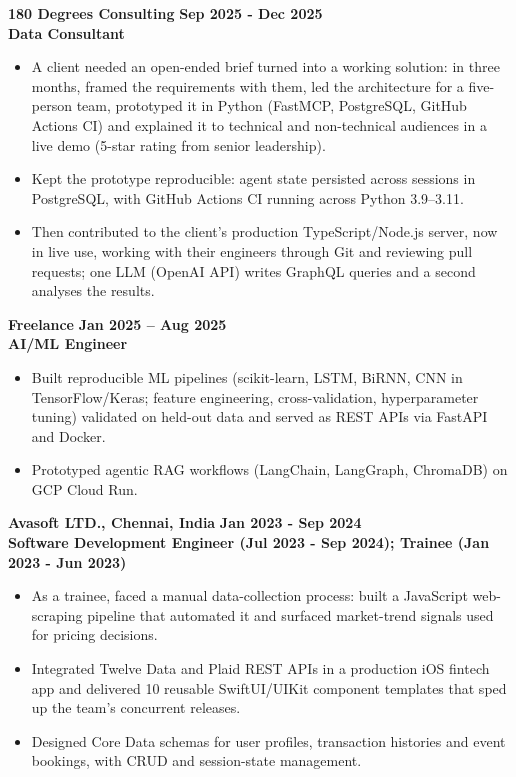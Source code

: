\documentclass[a4paper,11pt]{article}
\begin{document}
\vspace{6pt}

\noindent
\textbf{180 Degrees Consulting}
\hfill \textbf{Sep 2025 - Dec 2025}
\\
\textbf{Data Consultant}

\begin{itemize}
    \item A client needed an open-ended brief turned into a working solution: in three months, framed the requirements with them, led the architecture for a five-person team, prototyped it in Python (FastMCP, PostgreSQL, GitHub Actions CI) and explained it to technical and non-technical audiences in a live demo (5-star rating from senior leadership).
    \item Kept the prototype reproducible: agent state persisted across sessions in PostgreSQL, with GitHub Actions CI running across Python 3.9--3.11.
    \item Then contributed to the client's production TypeScript/Node.js server, now in live use, working with their engineers through Git and reviewing pull requests; one LLM (OpenAI API) writes GraphQL queries and a second analyses the results.
\end{itemize}

\vspace{6pt}

\noindent
\textbf{Freelance}
\hfill \textbf{Jan 2025 -- Aug 2025}
\\
\textbf{AI/ML Engineer}

\begin{itemize}
    \item Built reproducible ML pipelines (scikit-learn, LSTM, BiRNN, CNN in TensorFlow/Keras; feature engineering, cross-validation, hyperparameter tuning) validated on held-out data and served as REST APIs via FastAPI and Docker.
    \item Prototyped agentic RAG workflows (LangChain, LangGraph, ChromaDB) on GCP Cloud Run.
\end{itemize}

\vspace{6pt}

\noindent
\textbf{Avasoft LTD., Chennai, India}
\hfill \textbf{Jan 2023 - Sep 2024}
\\
\textbf{Software Development Engineer (Jul 2023 - Sep 2024); Trainee (Jan 2023 - Jun 2023)}

\begin{itemize}
    \item As a trainee, faced a manual data-collection process: built a JavaScript web-scraping pipeline that automated it and surfaced market-trend signals used for pricing decisions.
    \item Integrated Twelve Data and Plaid REST APIs in a production iOS fintech app and delivered 10 reusable SwiftUI/UIKit component templates that sped up the team's concurrent releases.
    \item Designed Core Data schemas for user profiles, transaction histories and event bookings, with CRUD and session-state management.
\end{itemize}
\end{document}
